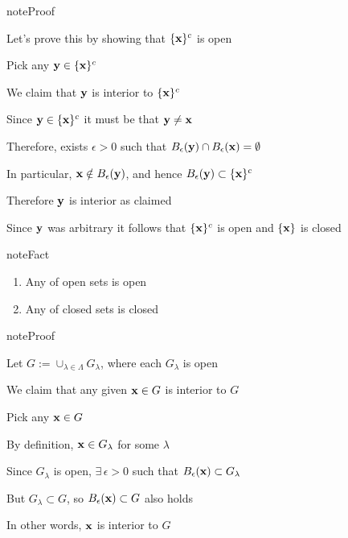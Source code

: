 \documentclass[letterpaper,10pt,english]{jupyterBook}
\begin{document}
\begin{sphinxadmonition}{note}{Proof}

\sphinxAtStartPar
Let’s prove this by showing that \(\{{\bf x}\}^c\) is open

\sphinxAtStartPar
Pick any \({\bf y} \in \{{\bf x}\}^c\)

\sphinxAtStartPar
We claim that \({\bf y}\) is interior to \(\{{\bf x}\}^c\)

\sphinxAtStartPar
Since \({\bf y} \in \{{\bf x}\}^c\) it must be that \({\bf y} \ne {\bf x}\)

\sphinxAtStartPar
Therefore, exists \(\epsilon > 0\) such that \(B_\epsilon({\bf y}) \cap B_\epsilon({\bf x}) = \emptyset\)

\sphinxAtStartPar
In particular, \({\bf x} \notin B_\epsilon({\bf y})\), and hence \(B_\epsilon({\bf y}) \subset \{{\bf x}\}^c\)

\sphinxAtStartPar
Therefore \({\bf y}\) is interior as claimed

\sphinxAtStartPar
Since \({\bf y}\) was arbitrary it follows that \(\{{\bf x}\}^c\) is open and \(\{{\bf x}\}\) is closed
\end{sphinxadmonition}

\begin{sphinxadmonition}{note}{Fact}
\begin{enumerate}
%
\item {} 
\sphinxAtStartPar
Any  of open sets is open

\item {} 
\sphinxAtStartPar
Any  of closed sets is closed

\end{enumerate}
\end{sphinxadmonition}

\begin{sphinxadmonition}{note}{Proof}

\sphinxAtStartPar
{}

\sphinxAtStartPar
Let \(G := \cup_{\lambda \in \Lambda} G_\lambda\), where each \(G_\lambda\) is
open

\sphinxAtStartPar
We claim that any given \({\bf x} \in G\) is interior to \(G\)

\sphinxAtStartPar
Pick any \({\bf x} \in G\)

\sphinxAtStartPar
By definition, \({\bf x} \in G_\lambda\) for some \(\lambda\)

\sphinxAtStartPar
Since \(G_\lambda\) is open, \(\exists \, \epsilon > 0\) such that \(B_\epsilon({\bf x})
\subset G_\lambda\)

\sphinxAtStartPar
But \(G_\lambda \subset G\), so \(B_\epsilon({\bf x}) \subset G\) also holds

\sphinxAtStartPar
In other words, \({\bf x}\) is interior to \(G\)
\end{sphinxadmonition}
\end{document}
